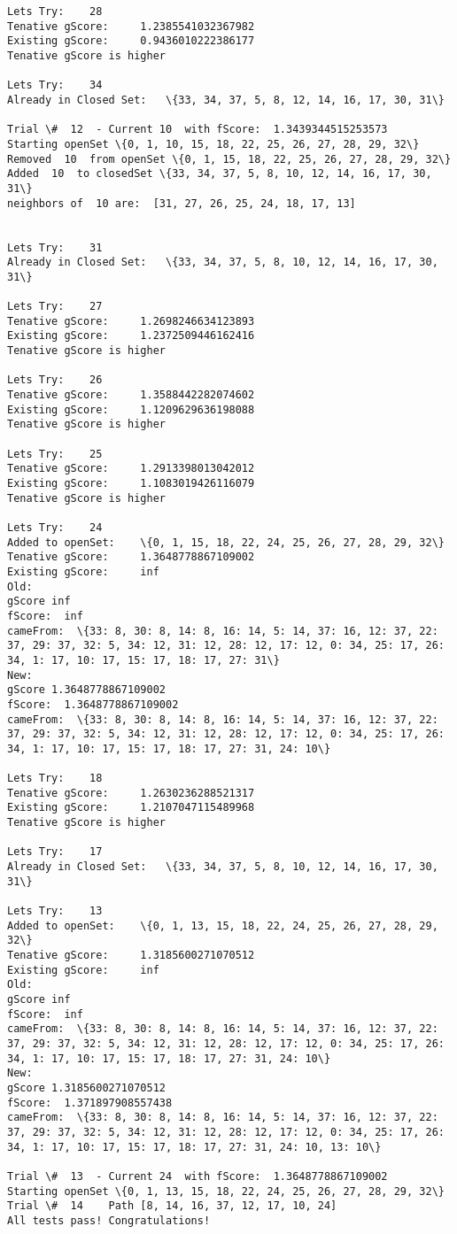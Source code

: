\documentclass[11pt]{article}
\begin{document}
\begin{Verbatim}[commandchars=\\\{\}]
Lets Try:	 28
Tenative gScore:	 1.2385541032367982
Existing gScore:	 0.9436010222386177
Tenative gScore is higher

Lets Try:	 34
Already in Closed Set:	 \{33, 34, 37, 5, 8, 12, 14, 16, 17, 30, 31\}

Trial \#  12  - Current 10  with fScore:  1.3439344515253573
Starting openSet \{0, 1, 10, 15, 18, 22, 25, 26, 27, 28, 29, 32\}
Removed  10  from openSet \{0, 1, 15, 18, 22, 25, 26, 27, 28, 29, 32\}
Added  10  to closedSet \{33, 34, 37, 5, 8, 10, 12, 14, 16, 17, 30, 31\}
neighbors of  10 are:  [31, 27, 26, 25, 24, 18, 17, 13] 


Lets Try:	 31
Already in Closed Set:	 \{33, 34, 37, 5, 8, 10, 12, 14, 16, 17, 30, 31\}

Lets Try:	 27
Tenative gScore:	 1.2698246634123893
Existing gScore:	 1.2372509446162416
Tenative gScore is higher

Lets Try:	 26
Tenative gScore:	 1.3588442282074602
Existing gScore:	 1.1209629636198088
Tenative gScore is higher

Lets Try:	 25
Tenative gScore:	 1.2913398013042012
Existing gScore:	 1.1083019426116079
Tenative gScore is higher

Lets Try:	 24
Added to openSet:	 \{0, 1, 15, 18, 22, 24, 25, 26, 27, 28, 29, 32\}
Tenative gScore:	 1.3648778867109002
Existing gScore:	 inf
Old:
gScore inf
fScore:  inf
cameFrom:  \{33: 8, 30: 8, 14: 8, 16: 14, 5: 14, 37: 16, 12: 37, 22: 37, 29: 37, 32: 5, 34: 12, 31: 12, 28: 12, 17: 12, 0: 34, 25: 17, 26: 34, 1: 17, 10: 17, 15: 17, 18: 17, 27: 31\}
New:
gScore 1.3648778867109002
fScore:  1.3648778867109002
cameFrom:  \{33: 8, 30: 8, 14: 8, 16: 14, 5: 14, 37: 16, 12: 37, 22: 37, 29: 37, 32: 5, 34: 12, 31: 12, 28: 12, 17: 12, 0: 34, 25: 17, 26: 34, 1: 17, 10: 17, 15: 17, 18: 17, 27: 31, 24: 10\}

Lets Try:	 18
Tenative gScore:	 1.2630236288521317
Existing gScore:	 1.2107047115489968
Tenative gScore is higher

Lets Try:	 17
Already in Closed Set:	 \{33, 34, 37, 5, 8, 10, 12, 14, 16, 17, 30, 31\}

Lets Try:	 13
Added to openSet:	 \{0, 1, 13, 15, 18, 22, 24, 25, 26, 27, 28, 29, 32\}
Tenative gScore:	 1.3185600271070512
Existing gScore:	 inf
Old:
gScore inf
fScore:  inf
cameFrom:  \{33: 8, 30: 8, 14: 8, 16: 14, 5: 14, 37: 16, 12: 37, 22: 37, 29: 37, 32: 5, 34: 12, 31: 12, 28: 12, 17: 12, 0: 34, 25: 17, 26: 34, 1: 17, 10: 17, 15: 17, 18: 17, 27: 31, 24: 10\}
New:
gScore 1.3185600271070512
fScore:  1.371897908557438
cameFrom:  \{33: 8, 30: 8, 14: 8, 16: 14, 5: 14, 37: 16, 12: 37, 22: 37, 29: 37, 32: 5, 34: 12, 31: 12, 28: 12, 17: 12, 0: 34, 25: 17, 26: 34, 1: 17, 10: 17, 15: 17, 18: 17, 27: 31, 24: 10, 13: 10\}

Trial \#  13  - Current 24  with fScore:  1.3648778867109002
Starting openSet \{0, 1, 13, 15, 18, 22, 24, 25, 26, 27, 28, 29, 32\}
Trial \#  14 	Path [8, 14, 16, 37, 12, 17, 10, 24]
All tests pass! Congratulations!

    \end{Verbatim}
\end{document}
